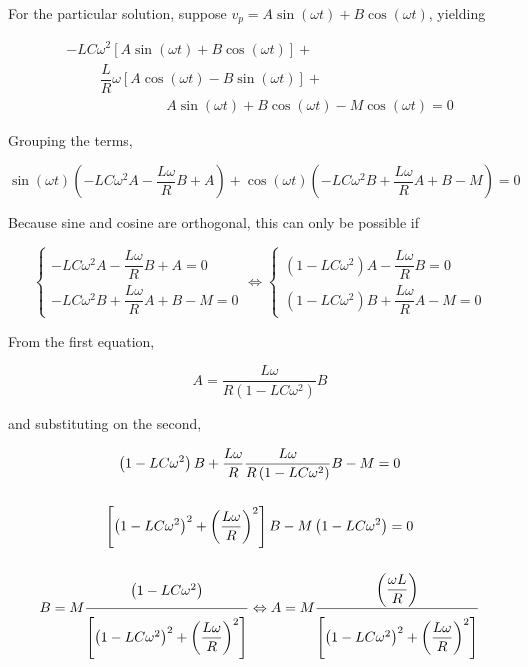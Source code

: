\begin{example}
	For the particular solution, suppose $v_p = A\sin\left(\omega t\right) + B\cos\left(\omega t\right)$, yielding

\begin{gather} -LC\omega^2\left[A\sin\left(\omega t\right) + B\cos\left(\omega t\right) \right] + \nonumber\\[5mm]\hspace{1cm} \dfrac{L}{R}\omega \left[A\cos\left(\omega t\right) - B\sin\left(\omega t\right) \right] + \nonumber\\[5mm]\hspace{3cm} A\sin\left(\omega t\right) + B\cos\left(\omega t\right) - M\cos\left(\omega t\right) = 0 \end{gather}

	Grouping the terms,

\begin{equation} \sin\left(\omega t\right) \left( -LC\omega^2 A - \dfrac{L\omega}{R}B + A\right) + \cos\left(\omega t\right)\left(-LC\omega^2 B + \dfrac{L\omega}{R}A + B - M\right) = 0 \end{equation}

	Because sine and cosine are orthogonal, this can only be possible if

\begin{equation}\left\{\begin{array}{l} -LC\omega^2 A - \dfrac{L\omega}{R}B + A = 0 \\[5mm] -LC\omega^2 B + \dfrac{L\omega}{R}A + B - M = 0 \end{array}\right. \Leftrightarrow \left\{\begin{array}{l} \left(1 -LC\omega^2\right) A - \dfrac{L\omega}{R}B = 0 \\[5mm] \left(1 - LC\omega^2 \right) B + \dfrac{L\omega}{R}A - M = 0 \end{array}\right. \end{equation}
	
	From the first equation,

\begin{equation}  A = \dfrac{L\omega}{R\left(1 -LC\omega^2\right)}B  \end{equation}

	\noindent and substituting on the second,

\begin{gather}
	\left(1 - LC\omega^2 \right) B + \dfrac{L\omega}{R}\dfrac{L\omega}{R\left(1 -LC\omega^2\right)}B - M = 0 \nonumber\\[5mm]
	\left[\left(1 - LC\omega^2 \right)^2 + \left(\dfrac{L\omega}{R}\right)^2 \right] B - M\left(1 - LC\omega^2 \right) = 0 \nonumber\\[5mm]
	B = M\xfrac{2mm}{5mm}{\left(1 - LC\omega^2 \right)}{\left[\left(1 - LC\omega^2 \right)^2 + \left(\dfrac{L\omega}{R}\right)^2 \right]} \Leftrightarrow A = M\xfrac{2mm}{5mm}{\left( \dfrac{\omega L}{R} \right)}{\left[\left(1 - LC\omega^2 \right)^2 + \left(\dfrac{L\omega}{R}\right)^2 \right]}
\end{gather}


\end{example}
